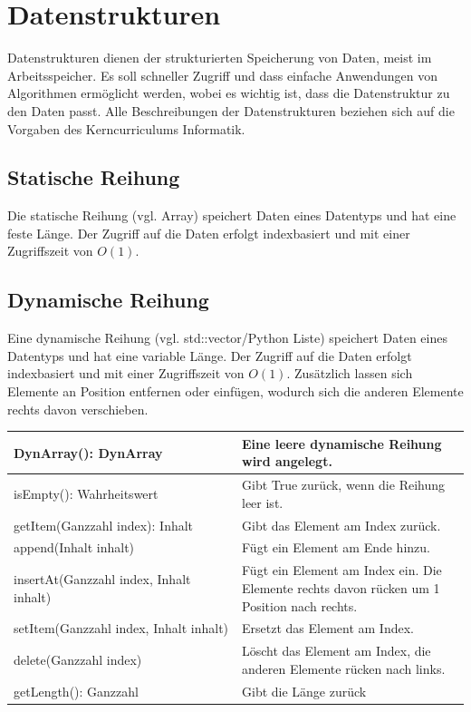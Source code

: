 \section{Datenstrukturen}

Datenstrukturen dienen der strukturierten Speicherung von Daten, meist im Arbeitsspeicher.
Es soll schneller Zugriff und dass einfache Anwendungen von Algorithmen ermöglicht werden,
wobei es wichtig ist, dass die Datenstruktur zu den Daten passt.
Alle Beschreibungen der Datenstrukturen beziehen sich auf die Vorgaben des
Kerncurriculums Informatik.

\subsection{Statische Reihung}

Die statische Reihung (vgl. Array) speichert Daten eines Datentyps und hat
eine feste Länge. Der Zugriff auf die Daten erfolgt indexbasiert und
mit einer Zugriffszeit von $O(1)$.

\subsection{Dynamische Reihung}

Eine dynamische Reihung (vgl. std::vector/Python Liste) speichert Daten eines Datentyps und hat
eine variable Länge. Der Zugriff auf die Daten erfolgt indexbasiert und
mit einer Zugriffszeit von $O(1)$. Zusätzlich lassen sich Elemente an Position
entfernen oder einfügen, wodurch sich die anderen Elemente rechts davon verschieben.

\begin{table}[H]
    \begin{tabular}{|p{0.5\linewidth}|p{0.5\linewidth}|}
    \hline
    DynArray(): DynArray & Eine leere dynamische Reihung wird angelegt. \\ \hline
    isEmpty(): Wahrheitswert & Gibt True zurück, wenn die Reihung leer ist. \\ \hline
    getItem(Ganzzahl index): Inhalt & Gibt das Element am Index zurück. \\ \hline
    append(Inhalt inhalt) & Fügt ein Element am Ende hinzu. \\ \hline
    insertAt(Ganzzahl index, Inhalt inhalt) & Fügt ein Element am Index ein. Die Elemente rechts davon rücken um 1 Position nach rechts. \\ \hline
    setItem(Ganzzahl index, Inhalt inhalt) & Ersetzt das Element am Index. \\ \hline
    delete(Ganzzahl index) & Löscht das Element am Index, die anderen Elemente rücken nach links. \\ \hline
    getLength(): Ganzzahl & Gibt die Länge zurück \\ \hline
    \end{tabular}
\end{table}

